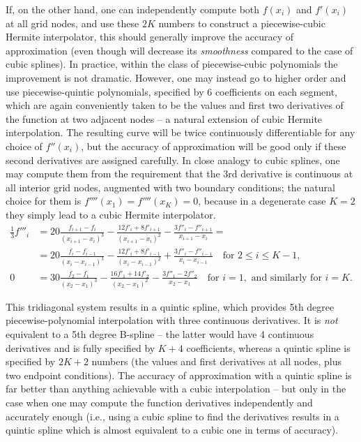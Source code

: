 \documentclass[12pt]{article}
\begin{document}
If, on the other hand, one can independently compute both $f(x_i)$ and $f'(x_i)$ at all grid nodes, and use these $2K$ numbers to construct a piecewise-cubic Hermite interpolator, this should generally improve the accuracy of approximation (even though will decrease its \textit{smoothness} compared to the case of cubic splines). In practice, within the class of piecewise-cubic polynomials the improvement is not dramatic. However, one may instead go to higher order and use piecewise-quintic polynomials, specified by 6 coefficients on each segment, which are again conveniently taken to be the values and first two derivatives of the function at two adjacent nodes -- a natural extension of cubic Hermite interpolation. The resulting curve will be twice continuously differentiable for any choice of $f''(x_i)$, but the accuracy of approximation will be good only if these second derivatives are assigned carefully. In close analogy to cubic splines, one may compute them from the requirement that the 3rd derivative is continuous at all interior grid nodes, augmented with two boundary conditions; the natural choice for them is $f''''(x_1)=f''''(x_K)=0$, because in a degenerate case $K=2$ they simply lead to a cubic Hermite interpolator.
\begin{subequations}
\begin{align}
\frac{1}{3} f'''_i
&= 20 \frac{f_{i+1}-f_i}{(x_{i+1}-x_i)^3} - \frac{12f'_i+8f'_{i+1}}{(x_{i+1}-x_i)^2} - \frac{3f''_i-f''_{i+1}}{x_{i+1}-x_i} = \\
&= 20 \frac{f_i-f_{i-1}}{(x_i-x_{i-1})^3} - \frac{12f'_i+8f'_{i-1}}{(x_i-x_{i-1})^2} + \frac{3f''_i-f''_{i-1}}{x_i-x_{i-1}}\quad \mbox{for }2\le i \le K-1, \nonumber \\
0 &= 30\frac{f_2-f_1}{(x_2-x_1)^3} - \frac{16f'_1+14f'_2}{(x_2-x_1)^2} - \frac{3f''_1-2f''_2}{x_2-x_1} \quad\mbox{for }i=1,\mbox{ and similarly for }i=K.
\end{align}
\end{subequations}

This tridiagonal system results in a quintic spline, which provides 5th degree piecewise-polynomial interpolation with three continuous derivatives. It is \textit{not} equivalent to a 5th degree B-spline -- the latter would have 4 continuous derivatives and is fully specified by $K+4$ coefficients, whereas a quintic spline is specified by $2K+2$ numbers (the values and first derivatives at all nodes, plus two endpoint conditions). The accuracy of approximation with a quintic spline is far better than anything achievable with a cubic interpolation -- but only in the case when one may compute the function derivatives independently and accurately enough (i.e., using a cubic spline to find the derivatives results in a quintic spline which is almost equivalent to a cubic one in terms of accuracy).
\end{document}
